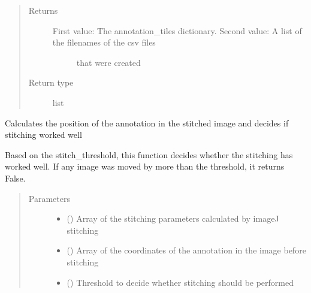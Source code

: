 \documentclass[letterpaper,10pt,english]{sphinxmanual}
\begin{document}
\begin{fulllineitems}
\begin{fulllineitems}
\begin{quote}
\begin{description}
\item[{Returns}] \leavevmode
\begin{description}
\item[{First value: The annotation\_tiles dictionary. Second value: A list of the filenames of the csv files}] \leavevmode
that were created

\end{description}


\item[{Return type}] \leavevmode
list

\end{description}\end{quote}

\end{fulllineitems}


\begin{fulllineitems}
\label{\detokenize{index:stitch_MAPS_annotations.Stitcher.process_stitching_params}}
Calculates the position of the annotation in the stitched image and decides if stitching worked well

Based on the stitch\_threshold, this function decides whether the stitching has worked well. If any image was
moved by more than the threshold, it returns False.
\begin{quote}\begin{description}
\item[{Parameters}] \leavevmode\begin{itemize}
\item {} 
 () \textendash{} Array of the stitching parameters calculated by imageJ stitching

\item {} 
 () \textendash{} Array of the coordinates of the annotation in the image before stitching

\item {} 
 () \textendash{} Threshold to decide whether stitching should be performed


\end{itemize}
\end{description}
\end{quote}
\end{fulllineitems}
\end{fulllineitems}
\end{document}
